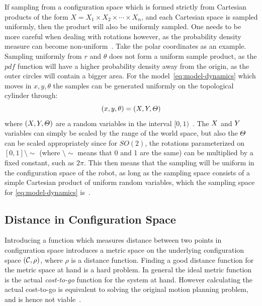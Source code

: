 If sampling from a configuration space which is formed strictly from Cartesian
products of the form \(X = X_1\times X_2\times \cdots \times X_n\), and each
Cartesian space is sampled uniformly, then the product will also be uniformly
sampled. One needs to be more careful when dealing with rotations however, as
the probability density measure can become non-uniform~\cite{Lav06}. Take the
polar coordinates as an example. Sampling uniformly from \(r\) and \(\theta\)
does not form a uniform sample product, as the \(pdf\) function will have a
higher probability density away from the origin, as the outer circles will
contain a bigger area. For the model~\cref{eq:model-dynamics} which moves in
\(x,y,\theta\) the samples can be generated uniformly on the topological
cylinder through:
\[
  (x,y,\theta) = (\mathnormal{X}, \mathnormal{Y}, \mathnormal{\Theta})
\]
where \((\mathnormal{X}, \mathnormal{Y}, \mathnormal{\Theta})\) are a random
variables in the interval \([0,1)\)~\cite{kuffnerEffectiveSamplingDistance2004}.
The \(\mathnormal{X}\) and \(\mathnormal{Y}\) variables can simply be scaled by
the range of the world space, but also the \(\mathnormal{\Theta}\) can be scaled
appropriately since for \(SO(2)\), the rotations parameterized on
\([0,1]\setminus\sim\) (where \(\setminus\sim\) means that 0 and 1 are the same)
can be multiplied by a fixed constant, such as \(2\pi\). This then means that
the sampling will be uniform in the configuration space of the robot, as long as
the sampling space consists of a simple Cartesian product of uniform random
variables, which the sampling space for \cref{eq:model-dynamics}
is~\cite{Lav06}.

\subsection{Distance in Configuration Space}

Introducing a function which measures distance between two points in
configuration space introduces a metric space on the underlying configuration
space \((\mathcal{C}{},\rho)\), where \(\rho\) is a distance
function. Finding a good distance function for the metric space at hand is a
hard problem. In general the ideal metric function is the actual
\textit{cost-to-go} function for the system at hand. However calculating the
actual cost-to-go is equivalent to solving the original motion planning problem,
and is hence not viable~\cite{pengchengReducingMetricSensitivity2001}.


